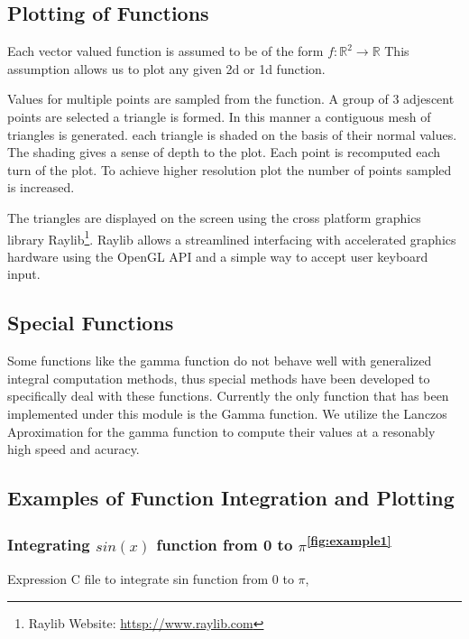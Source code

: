 \documentclass[12pt]{article}
\begin{document}
\subsection{Plotting of Functions}

Each vector valued function is assumed to be of the form $f:\mathbb{R}^2 \rightarrow \mathbb{R}$ This assumption allows us to plot any given 2d or 1d function.

Values for multiple points are sampled from the function. A group of 3 adjescent points are selected a triangle is formed. In this manner a contiguous mesh of
triangles is generated. each triangle is shaded on the basis of their normal values. The shading gives a sense of depth to the plot. Each point is recomputed each
turn of the plot. To achieve higher resolution plot the number of points sampled is increased.

The triangles are displayed on the screen using the cross platform graphics library Raylib\footnote{Raylib Website: \url{httsp://www.raylib.com}}. Raylib allows a streamlined interfacing with accelerated graphics
hardware using the OpenGL API and a simple way to accept user keyboard input.

\subsection{Special Functions}

Some functions like the gamma function do not behave well with generalized integral computation methods, thus special
methods have been developed to specifically deal with these functions. Currently the only function that has been implemented
under this module is the Gamma function. We utilize the Lanczos Aproximation\cite{aa} for the gamma function to compute their values at 
a resonably high speed and acuracy.

\subsection{Examples of Function Integration and Plotting}

\subsubsection{Integrating $sin(x)$ function from 0 to $\pi$\textsuperscript{\ref{fig:example1}}}

\begin{flushleft}
Expression C file to integrate sin function from 0 to $\pi$,
\end{flushleft}
\end{document}
